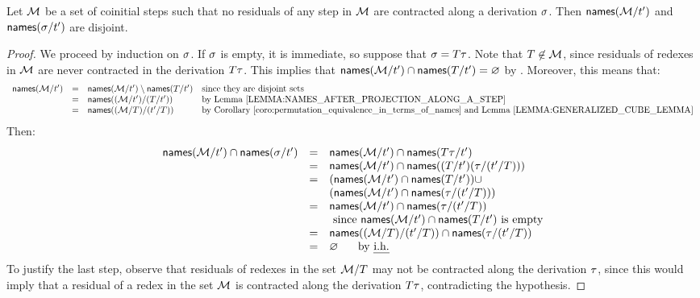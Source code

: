 \begin{lemma}
Let $\mathcal{M}$ be a set of coinitial steps such that no residuals of any step in $\mathcal{M}$
are contracted along a derivation $\sigma$.
Then $\mathsf{names}(\mathcal{M}/t')$ and $\mathsf{names}(\sigma/t')$ are disjoint.
\end{lemma}
\begin{proof}
We proceed by induction on $\sigma$. If $\sigma$ is empty, it is immediate,
so suppose that $\sigma = T\tau$.
Note that $T \not\in \mathcal{M}$,
since residuals of redexes in $\mathcal{M}$ are never contracted in the derivation $T\tau$.
This implies that $\mathsf{names}(\mathcal{M}/t') \cap \mathsf{names}(T/t') = \varnothing$
by .
Moreover, this means that:
\[
  \begin{array}{rcll}
  \names(\redexset/\tm')
  & = & \names(\redexset/\tm') \setminus \names(\redexthree/\tm') & \text{since they are disjoint sets} \\
  & = & \names((\redexset/\tm')/(\redexthree/\tm')) & \text{by \rlem{names_after_projection_along_a_step}} \\
  & = & \names((\redexset/\redexthree)/(\tm'/\redexthree)) & \text{by \rcoro{permutation_equivalence_in_terms_of_names} and \rlem{generalized_cube_lemma}} \\
  \end{array}
\]
Then:
\[
  \begin{array}{rcll}
  \mathsf{names}(\mathcal{M}/t') \cap \mathsf{names}(\sigma/t')
  & = & \mathsf{names}(\mathcal{M}/t') \cap \mathsf{names}(T\tau/t') \\
  & = & \mathsf{names}(\mathcal{M}/t') \cap \mathsf{names}((T/t')(\tau/(t'/T))) \\
  & = & (\mathsf{names}(\mathcal{M}/t') \cap \mathsf{names}(T/t')) \cup \\
    && (\mathsf{names}(\mathcal{M}/t') \cap \mathsf{names}(\tau/(t'/T))) \\
  & = & \mathsf{names}(\mathcal{M}/t') \cap \mathsf{names}(\tau/(t'/T)) \\
  && \text{ since $\mathsf{names}(\mathcal{M}/t') \cap \mathsf{names}(T/t')$ is empty} \\
  & = & \mathsf{names}((\mathcal{M}/T)/(t'/T)) \cap \mathsf{names}(\tau/(t'/T)) \\
  & = & \varnothing \hspace{.5cm}\text{ by {\em i.h.}} \\
  \end{array}
\]
To justify the last step, observe that residuals of redexes in the set $\mathcal{M}/T$
may not be contracted along the derivation $\tau$,
since this would imply that a residual of a redex in the set $\mathcal{M}$
is contracted along the derivation $T\tau$,
contradicting the hypothesis.
\end{proof}

